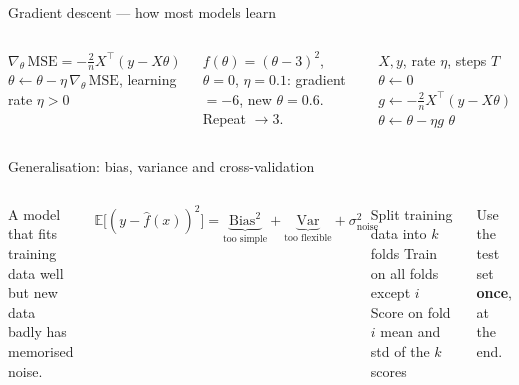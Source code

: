 \documentclass[aspectratio=169,11pt]{beamer}
\begin{document}
\begin{frame}{Gradient descent --- how most models learn}
\begin{columns}[T]
\begin{bmath}
$\nabla_\theta\,\mathrm{MSE}=-\frac{2}{n}X^\top(y-X\theta)$\\[3pt]
$\theta\leftarrow\theta-\eta\,\nabla_\theta\,\mathrm{MSE}$, \;learning rate $\eta>0$
\end{bmath}
\begin{bex}
$f(\theta)=(\theta-3)^2$, $\theta=0$, $\eta=0.1$: gradient $=-6$, new $\theta=0.6$. Repeat $\rightarrow 3$.
\end{bex}
\begin{balgo}
\begin{algorithmic}[1]
\Require $X,y$, rate $\eta$, steps $T$
\State $\theta\gets 0$
  \State $g\gets -\frac{2}{n}X^\top(y-X\theta)$
  \State $\theta\gets\theta-\eta g$
\EndFor
\State \Return $\theta$
\end{algorithmic}
\end{balgo}
\end{columns}
\end{frame}

\begin{frame}{Generalisation: bias, variance and cross-validation}
\begin{columns}[T]
\begin{bdef}[Overfitting]
A model that fits training data well but new data badly has memorised noise.
\end{bdef}
\begin{bmath}
$\mathbb{E}\big[(y-\hat f(x))^2\big]=\underbrace{\mathrm{Bias}^2}_{\text{too simple}}+\underbrace{\mathrm{Var}}_{\text{too flexible}}+\sigma^2_{\text{noise}}$
\end{bmath}
\begin{balgo}
\begin{algorithmic}[1]
\State Split training data into $k$ folds
  \State Train on all folds except $i$
  \State Score on fold $i$
\EndFor
\State \Return mean and std of the $k$ scores
\end{algorithmic}
\end{balgo}
\begin{bwarn}
Use the test set \textbf{once}, at the end.
\end{bwarn}
\end{columns}
\end{frame}
\end{document}
